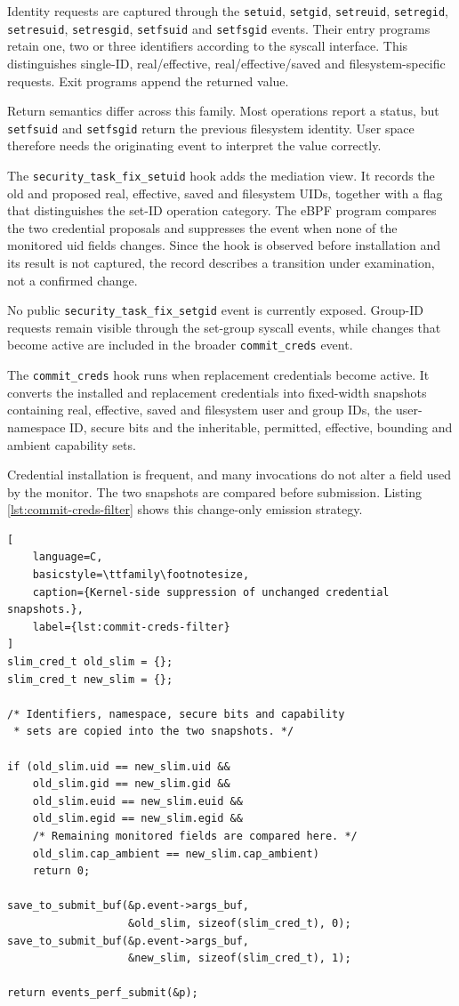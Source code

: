 Identity requests are captured through the \texttt{setuid},
\texttt{setgid}, \texttt{setreuid}, \texttt{setregid},
\texttt{setresuid}, \texttt{setresgid}, \texttt{setfsuid} and
\texttt{setfsgid} events. Their entry programs retain one, two or three
identifiers according to the syscall interface. This distinguishes single-ID,
real/effective, real/effective/saved and filesystem-specific requests. Exit
programs append the returned value.

Return semantics differ across this family. Most operations report a status,
but \texttt{setfsuid} and \texttt{setfsgid} return the previous filesystem
identity. User space therefore needs the originating event to interpret the
value correctly.

The \texttt{security\_task\_fix\_setuid} hook adds the mediation view. It
records the old and proposed real, effective, saved and filesystem UIDs,
together with a flag that distinguishes the set-ID operation category. The
eBPF program compares the two credential proposals and suppresses the event
when none of the monitored \gls{uid} fields changes. Since the hook is observed
before installation and its result is not captured, the record describes a
transition under examination, not a confirmed change.

No public \texttt{security\_task\_fix\_setgid} event is currently exposed.
Group-ID requests remain visible through the set-group syscall events, while
changes that become active are included in the broader
\texttt{commit\_creds} event.

The \texttt{commit\_creds} hook runs when replacement credentials become active.
It converts the installed and replacement credentials into fixed-width
snapshots containing real, effective, saved and filesystem user and group IDs,
the user-namespace ID, secure bits and the inheritable, permitted, effective,
bounding and ambient capability sets.

Credential installation is frequent, and many invocations do not alter a field
used by the monitor. The two snapshots are compared before submission. Listing
\ref{lst:commit-creds-filter} shows this change-only emission strategy.

\begin{lstlisting}[
    language=C,
    basicstyle=\ttfamily\footnotesize,
    caption={Kernel-side suppression of unchanged credential snapshots.},
    label={lst:commit-creds-filter}
]
slim_cred_t old_slim = {};
slim_cred_t new_slim = {};

/* Identifiers, namespace, secure bits and capability
 * sets are copied into the two snapshots. */

if (old_slim.uid == new_slim.uid &&
    old_slim.gid == new_slim.gid &&
    old_slim.euid == new_slim.euid &&
    old_slim.egid == new_slim.egid &&
    /* Remaining monitored fields are compared here. */
    old_slim.cap_ambient == new_slim.cap_ambient)
    return 0;

save_to_submit_buf(&p.event->args_buf,
                   &old_slim, sizeof(slim_cred_t), 0);
save_to_submit_buf(&p.event->args_buf,
                   &new_slim, sizeof(slim_cred_t), 1);

return events_perf_submit(&p);
\end{lstlisting}

